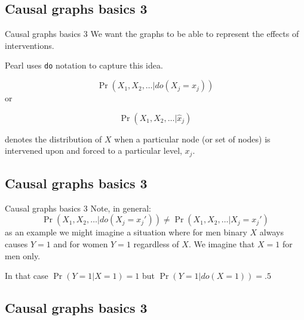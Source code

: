 \documentclass[
  11pt,
  ignorenonframetext,
]{beamer}
\begin{document}
\hypertarget{causal-graphs-basics-3}{%
\subsection{Causal graphs basics 3}\label{causal-graphs-basics-3}}

\begin{frame}[fragile]{Causal graphs basics 3}
We want the graphs to be able to represent the effects of interventions.

Pearl uses \texttt{do} notation to capture this idea.

\[\Pr(X_1, X_2,\dots | do(X_j = x_j))\] or

\[\Pr(X_1, X_2,\dots | \hat{x}_j)\]

denotes the distribution of \(X\) when a particular node (or set of
nodes) is intervened upon and forced to a particular level, \(x_j\).
\end{frame}

\hypertarget{causal-graphs-basics-3-1}{%
\subsection{Causal graphs basics 3}\label{causal-graphs-basics-3-1}}

\begin{frame}{Causal graphs basics 3}
Note, in general:
\[\Pr(X_1, X_2,\dots | do(X_j = x_j')) \neq \Pr(X_1, X_2,\dots | X_j = x_j')\]
as an example we might imagine a situation where for men binary \(X\)
always causes \(Y=1\) and for women \(Y=1\) regardless of \(X\). We
imagine that \(X=1\) for men only.

In that case \(\Pr(Y=1 | X = 1) = 1\) but \(\Pr(Y=1 | do(X = 1)) = .5\)
\end{frame}

\hypertarget{causal-graphs-basics-3-2}{%
\subsection{Causal graphs basics 3}\label{causal-graphs-basics-3-2}}
\end{document}
